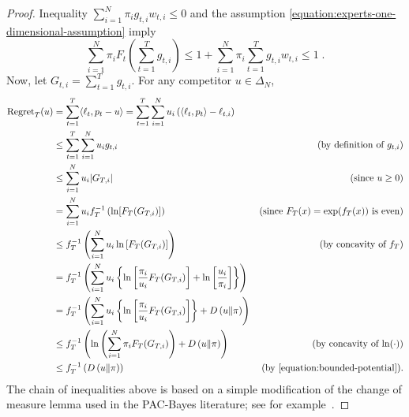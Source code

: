\begin{proof}
Inequality $\sum_{i=1}^N \pi_i g_{t,i} w_{t,i} \le 0$ and the assumption
\eqref{equation:experts-one-dimensional-assumption} imply
\begin{equation}
\label{equation:bounded-potential}
\sum_{i=1}^N  \pi_i F_t \left(\sum_{t=1}^T g_{t,i} \right) \le 1 + \sum_{i=1}^N \pi_i \sum_{t=1}^T  g_{t,i} w_{t,i} \le 1 \; .
\end{equation}
Now, let $G_{t,i} =
\sum_{t=1}^T g_{t,i}$. For any competitor $u \in \Delta_N$,
\begingroup
\allowdisplaybreaks
\begin{align*}
\allowdisplaybreaks
\Regret_T(u)
& = \sum_{t=1}^T \langle \ell_t, p_t - u \rangle
= \sum_{t=1}^T \sum_{i=1}^N u_i \left( \langle \ell_t, p_t \rangle - \ell_{t,i} \right) \\
& \le \sum_{t=1}^T \sum_{i=1}^N u_i g_{t,i} & \text{(by definition of $g_{t,i}$)} \\
& \le \sum_{i=1}^N u_i |G_{T,i}| & \text{(since $u \ge 0$)}  \\
& = \sum_{i=1}^N u_i f_T^{-1}\left(\ln [F_T(G_{T,i})] \right)  & \text{(since $F_T(x) = \exp(f_T(x))$ is even)} \\
& \le f_T^{-1}\left(\sum_{i=1}^N u_i \ln \left[ F_T(G_{T,i}) \right]\right) & \text{(by concavity of $f_T$)} \\
& = f_T^{-1}\left(\sum_{i=1}^N u_i \left\{\ln \left[ \frac{\pi_i}{u_i} F_T(G_{T,i}) \right] + \ln \left[\frac{u_i}{\pi_i}\right] \right\} \right) \\
& = f_T^{-1}\left(\sum_{i=1}^N u_i \left\{\ln \left[\frac{\pi_i}{u_i} F_T(G_{T,i}) \right]\right\} + \KL{u}{\pi}\right) \\
& \le f_T^{-1}\left(\ln \left(\sum_{i=1}^N \pi_i F_T(G_{T,i}) \right) + \KL{u}{\pi}\right) & \text{(by concavity of $\ln(\cdot)$)} \\
& \le f_T^{-1}\left(\KL{u}{\pi}\right) & \text{(by \eqref{equation:bounded-potential})}.
\end{align*}
\endgroup
The chain of inequalities above is based on a simple modification of the change
of measure lemma used in the PAC-Bayes literature; see for
example~\citet{McAllester13}.
\end{proof}
